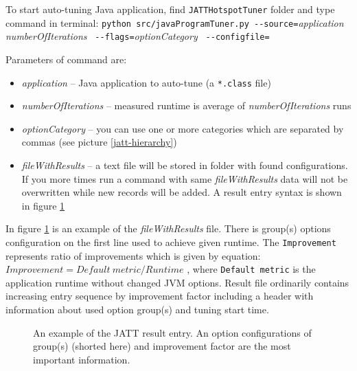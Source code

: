 \documentclass[
  digital, %
  oneside,
  notable, %
  nolof,     %
  nolot     %
]{fithesis3}
\begin{document}
To start auto-tuning Java application, find \texttt{JATTHotspotTuner} folder and type command in terminal: \newline \texttt{python src/javaProgramTuner.py -\--source=}\textit{application} \texttt{}\textit{numberOfIterations} \texttt{\ -\--flags=}\textit{optionCategory} \texttt{\ -\--configfile=}\textit{} \newline

Parameters of command are:
\begin{itemize}
	\item \textit{application} -- Java application to auto-tune (a \texttt{*.class} file)
	\item \textit{numberOfIterations} -- measured runtime is average of \textit{numberOfIterations} runs
	\item \textit{optionCategory} -- you can use one or more categories which are separated by commas (see picture \ref{jatt-hierarchy})
	\item \textit{fileWithResults} -- a text file will be stored in \texttt{} folder with found configurations. If you more times run a command with same \textit{fileWithResults} data will not be overwritten while new records will be added. A result entry syntax is shown in figure \ref{jatt-result}
\end{itemize}

In figure \ref{jatt-result} is an example of the \textit{fileWithResults} file. There is group(s) options configuration on the first line used to achieve given runtime. The \texttt{Improvement} represents ratio of improvements which is given by equation: $Improvement = Default\ metric / Runtime$ \cite{jatt-web-dzone}, where \texttt{Default metric} is the application runtime without changed JVM options. Result file ordinarily contains increasing entry sequence by improvement factor including a header with information about used option group(s) and tuning start time.
\begin{figure}[h]
	\caption{An example of the JATT result entry. An option configurations of group(s) (shorted here) and improvement factor are the most important information.}
	\label{jatt-result}
\end{figure}
\end{document}
